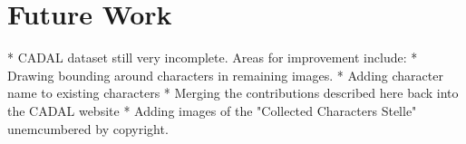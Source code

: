 \chapter{Future Work}


* CADAL dataset still very incomplete.  Areas for improvement include:
    * Drawing bounding around characters in remaining images.
    * Adding character name to existing characters
    * Merging the contributions described here back into the CADAL website
    * Adding images of the "Collected Characters Stelle" unemcumbered by copyright.
    
